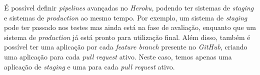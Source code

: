 É possível definir \textit{pipelines} avançadas no \textit{Heroku}, podendo ter sistemas de \textit{staging} e sistemas de \textit{production} ao mesmo tempo. Por exemplo, um sistema de \textit{staging} pode ter passado nos testes mas ainda está na fase de avaliação, enquanto que um sistema de \textit{production} já está pronto para utilização final. Além disso, também é possível ter uma aplicação por cada \textit{feature branch} presente no \textit{GitHub}, criando uma aplicação para cada \textit{pull request} ativo. Neste caso, temos apenas uma aplicação de \textit{staging} e uma para cada \textit{pull request} ativo.


